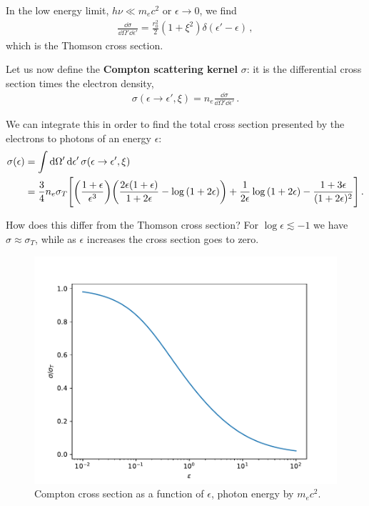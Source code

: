 \documentclass[main.tex]{subfiles}
\begin{document}
In the low energy limit, \(h \nu \ll m_e c^2 \) or \(\epsilon \to 0\), we find 
%
\begin{align}
\frac{ \dd{\sigma }}{ \dd{\Omega }' \dd{\epsilon }'} 
=
\frac{r_0^2}{2} (1 + \xi^2) \delta (\epsilon ' - \epsilon )
\,,
\end{align}
%
which is the Thomson cross section. 

Let us now define the \textbf{Compton scattering kernel} \(\sigma \): it is the differential cross section times the electron density,
%
\begin{align}
\sigma (\epsilon \to \epsilon ', \xi ) = n_e \frac{ \dd{\sigma }}{ \dd{\Omega }' \dd{\epsilon }'}
\,.
\end{align}

We can integrate this in order to find the total cross section presented by the electrons to photons of an energy \(\epsilon \): 
%
\begin{align}
\sigma (\epsilon ) &= \int \dd{\Omega '} \dd{\epsilon '} \sigma (\epsilon \to \epsilon ', \xi ) \\
&= \frac{3}{4} n_e \sigma_{T} \qty[ \qty(\frac{1 + \epsilon }{\epsilon^3}) 
\qty(\frac{2 \epsilon (1 + \epsilon )}{1 + 2 \epsilon }- \log \qty(1 + 2 \epsilon ))
+ 
\frac{1}{2 \epsilon } \log \qty(1 + 2 \epsilon )
- 
\frac{1 + 3 \epsilon }{(1 + 2 \epsilon )^2}
]
\,.
\end{align}

How does this differ from the Thomson cross section? For \(\log \epsilon \lesssim -1 \) we have \(\sigma \approx \sigma_T\), while as \(\epsilon \) increases the cross section goes to zero. 

\begin{figure}[ht]
\centering
\includegraphics[width=\textwidth]{figures/compton-sigma.pdf}
\caption{Compton cross section as a function of \(\epsilon \), photon energy by \(m_e c^2\). }
\label{fig:compton-sigma}
\end{figure}
\end{document}
